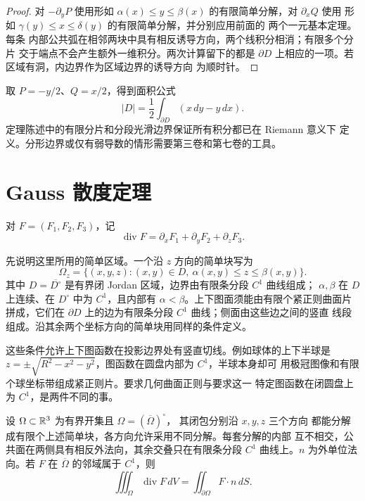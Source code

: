 \begin{proof}
对 \(-\partial_yP\) 使用形如
\(\alpha(x)\le y\le\beta(x)\) 的有限简单分解，对 \(\partial_xQ\) 使用
形如 \(\gamma(y)\le x\le\delta(y)\) 的有限简单分解，并分别应用前面的
两个一元基本定理。每条
内部公共弧在相邻两块中具有相反诱导方向，两个线积分相消；有限多个分片
交于端点不会产生额外一维积分。两次计算留下的都是
\(\partial D\) 上相应的一项。若区域有洞，内边界作为区域边界的诱导方向
为顺时针。
\end{proof}

取 \(P=-y/2\)、\(Q=x/2\)，得到面积公式
\[
 |D|=\frac12\int_{\partial D}(x\,dy-y\,dx).
\]
定理陈述中的有限分片和分段光滑边界保证所有积分都已在 Riemann 意义下
定义。分形边界或仅有弱导数的情形需要第三卷和第七卷的工具。

\section{Gauss 散度定理}

对 \(F=(F_1,F_2,F_3)\)，记
\[
 \operatorname{div}F
 =\partial_xF_1+\partial_yF_2+\partial_zF_3.
\]

先说明这里所用的简单区域。一个沿 $z$ 方向的简单块写为
\[
 \Omega_z=\{(x,y,z):(x,y)\in D,\
          \alpha(x,y)\le z\le\beta(x,y)\}.
\]
其中 $D=\overline{D^\circ}$ 是有界闭 Jordan 区域，边界由有限条分段
$C^1$ 曲线组成；
$\alpha,\beta$ 在 $D$ 上连续、在 $D^\circ$ 中为 $C^1$，且内部有
$\alpha<\beta$。上下图面须能由有限个紧正则曲面片拼成，它们在
$\partial D$ 上的边为有限条分段 $C^1$ 曲线；侧面由这些边之间的竖直
线段组成。沿其余两个坐标方向的简单块用同样的条件定义。

这些条件允许上下图函数在投影边界处有竖直切线。例如球体的上下半球是
$z=\pm\sqrt{R^2-x^2-y^2}$，图函数在圆盘内部为 $C^1$，半球本身却可
用极冠图像和有限个球坐标带组成紧正则片。要求几何曲面正则与要求这一
特定图函数在闭圆盘上为 $C^1$，是两件不同的事。

\begin{theorem}
\label{thm:gauss-divergence-classical}
设 \(\Omega\subset\mathbb{R}^3\) 为有界开集且 $\Omega=(\overline\Omega)^\circ$，
其闭包分别沿 $x,y,z$ 三个方向
都能分解成有限个上述简单块，各方向允许采用不同分解。每套分解的内部
互不相交，公共面在两侧具有相反外法向，其余交叠只在有限条分段 $C^1$
曲线上。\(n\) 为外单位法向。若 \(F\) 在
\(\overline\Omega\) 的邻域属于 \(C^1\)，则
\[
 \iiint_\Omega\operatorname{div}F\,dV
 =\iint_{\partial\Omega}F\cdot n\,dS.
\]
\end{theorem}

